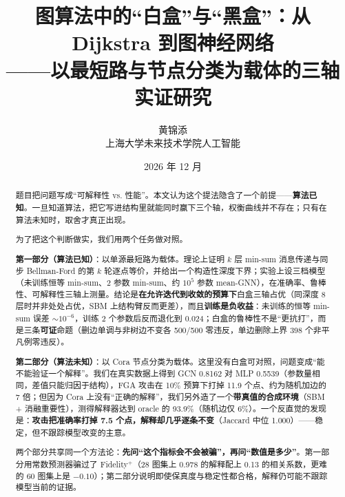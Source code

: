 \documentclass[a4paper,10pt]{article}
\title{\bfseries 图算法中的“白盒”与“黑盒”：从 Dijkstra 到图神经网络\\[2pt]
\large ——以最短路与节点分类为载体的三轴实证研究}
\author{黄锦添\quad 25121605\\ 上海大学未来技术学院\quad 人工智能}
\date{2026 年 12 月}
\begin{document}
\maketitle

\begin{abstract}
\noindent
题目把问题写成“可解释性 vs. 性能”。本文认为这个提法隐含了一个前提——\textbf{算法已知}。一旦知道算法，把它写进结构里就能同时赢下三个轴，权衡曲线并不存在；只有在算法未知时，取舍才真正出现。

为了把这个判断做实，我们用两个任务做对照。

\textbf{第一部分（算法已知）}：以单源最短路为载体。理论上证明 $k$ 层 min-sum 消息传递与同步 Bellman-Ford 的第 $k$ 轮逐点等价，并给出一个构造性深度下界；实验上设三档模型（未训练恒等 min-sum、2 参数 min-sum、约 $10^5$ 参数 mean-GNN），在准确率、鲁棒性、可解释性三轴上测量。结论是\textbf{在允许迭代到收敛的预算下}白盒三轴占优（同深度 8 层时并非处处占优，SBM 上结构臂反而更差），而且\textbf{训练是负收益}：未训练的恒等 min-sum 误差 $\sim10^{-6}$，训练 2 个参数后反而退化到 $0.024$；白盒的鲁棒性不是“更抗打”，而是三条\textbf{可证}命题（删边单调与非树边不变各 500/500 零违反，单边删除上界 398 个非平凡例零违反）。

\textbf{第二部分（算法未知）}：以 Cora 节点分类为载体。这里没有白盒可对照，问题变成“能不能验证一个解释”。我们在真实数据上得到 GCN 0.8162 对 MLP 0.5539（参数量相同，差值只能归因于结构），FGA 攻击在 10\% 预算下打掉 11.9 个点、约为随机加边的 7 倍；但因为 Cora 上没有“正确的解释”，我们另外造了一个\textbf{带真值的合成环境}（SBM + 消融重要性），测得解释器达到 oracle 的 93.9\%（随机边仅 6\%）。一个反直觉的发现是：\textbf{攻击把准确率打掉 7.5 个点，解释却几乎逐条不变}（Jaccard 中位 1.000）——稳定，但不跟踪模型改变的主意。

两个部分共享同一个方法论：\textbf{先问“这个指标会不会被骗”，再问“数值是多少”}。第一部分用常数预测器骗过了 Fidelity$^+$（28 图集上 0.978 的解释配上 0.13 的相关系数，更难的 60 图集上是 $-0.10$）；第二部分说明即使保真度与稳定性都合格，解释仍可能不跟踪模型当前的证据。
\end{abstract}

\tableofcontents
\vspace{-1.2em}











{\small


}
\end{document}
